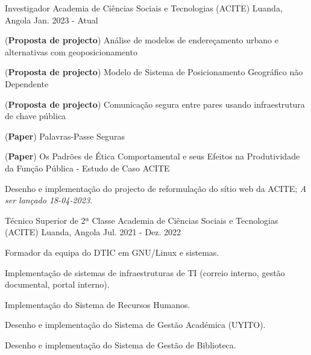 


\begin{cventries}


\cventry
{Investigador} %
{Academia de Ciências Sociais e Tecnologias (ACITE)} %
{Luanda, Angola} %
{Jan. 2023 - Atual} %
{ %
\begin{cvitems}
    \item (\textbf{Proposta de projecto}) Análise de modelos de endereçamento urbano e alternativas com geoposicionamento
    \item (\textbf{Proposta de projecto}) Modelo de Sistema de Posicionamento Geográfico não Dependente
    \item (\textbf{Proposta de projecto}) Comunicação segura entre pares usando infraestrutura de chave pública
    \item (\textbf{Paper}) Palavras-Passe Seguras
    \item (\textbf{Paper}) Os Padrões de Ética Comportamental e seus Efeitos na Produtividade da Função Pública - Estudo de Caso ACITE
    \item Desenho e implementação do projecto de reformulação do sítio web da ACITE; \textit{A ser lançado 18-04-2023}.
\end{cvitems}
}


\cventry
{Técnico Superior de 2ª Classe} %
{Academia de Ciências Sociais e Tecnologias (ACITE)} %
{Luanda, Angola} %
{Jul. 2021 - Dez. 2022} %
{ %
\begin{cvitems}
    \item Formador da equipa do DTIC em GNU/Linux e sistemas.
    \item Implementação de sistemas de infraestruturas de TI (correio interno, gestão documental, portal interno).
    \item Implementação do Sistema de Recursos Humanos.
    \item Desenho e implementação do Sistema de Gestão Académica (UYITO).
    \item Desenho e implementação do Sistema de Gestão de Biblioteca.
\end{cvitems}
}


\end{cventries}
